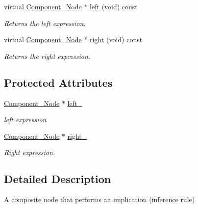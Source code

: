 \begin{DoxyCompactItemize}
virtual \hyperlink{classMadara_1_1Expression__Tree_1_1Component__Node}{Component\_\-Node} $\ast$ \hyperlink{classMadara_1_1Expression__Tree_1_1Composite__Binary__Node_a6ca5cccbc46ccc6026c18f9665298380}{left} (void) const 
\begin{DoxyCompactList}\small\item\em Returns the left expression. \item\end{DoxyCompactList}\item 
virtual \hyperlink{classMadara_1_1Expression__Tree_1_1Component__Node}{Component\_\-Node} $\ast$ \hyperlink{classMadara_1_1Expression__Tree_1_1Composite__Unary__Node_ade55cde5707e0fa73ab1c019159b9aec}{right} (void) const 
\begin{DoxyCompactList}\small\item\em Returns the right expression. \item\end{DoxyCompactList}\end{DoxyCompactItemize}
\subsection*{Protected Attributes}
\begin{DoxyCompactItemize}
\item 
\hyperlink{classMadara_1_1Expression__Tree_1_1Component__Node}{Component\_\-Node} $\ast$ \hyperlink{classMadara_1_1Expression__Tree_1_1Composite__Binary__Node_acac60a70beb2484737e6e7161edb2d1b}{left\_\-}
\begin{DoxyCompactList}\small\item\em left expression \item\end{DoxyCompactList}\item 
\hyperlink{classMadara_1_1Expression__Tree_1_1Component__Node}{Component\_\-Node} $\ast$ \hyperlink{classMadara_1_1Expression__Tree_1_1Composite__Unary__Node_a077b7bd1b52df6f5c6adfde735556a68}{right\_\-}
\begin{DoxyCompactList}\small\item\em Right expression. \item\end{DoxyCompactList}\end{DoxyCompactItemize}


\subsection{Detailed Description}
A composite node that performs an implication (inference rule) 

